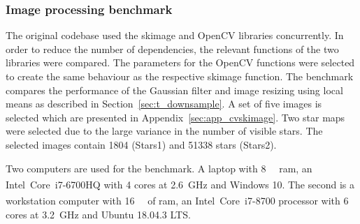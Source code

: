 \begin{table}[htb]
    \centering
    \caption{Summary of two profiles obtained while executing a complete run of \gls{sispo}, i.e. rendering, compression and reconstruction. More than \SI{90}{\percent} of total time is spent rendering images. Values are rounded to one decimal precision.}
    \label{tab:profiles}
\end{table}

\subsubsection{Image processing benchmark} \label{sec:cvskimage}
The original codebase used the \gls{skimage} and OpenCV libraries concurrently. In order to reduce the number of dependencies, the relevant functions of the two libraries were compared. The parameters for the OpenCV functions were selected to create the same behaviour as the respective \gls{skimage} function. The benchmark compares the performance of the Gaussian filter and image resizing using local means as described in Section~\ref{sec:t_downsample}. A set of five images is selected which are presented in Appendix~\ref{sec:app_cvskimage}. Two star maps were selected due to the large variance in the number of visible stars. The selected images contain 1804 (Stars1) and 51338 stars (Stars2).

Two computers are used for the benchmark. A laptop with \SI{8}{\giga\byte} \gls{ram}, an Intel\textsuperscript{\textregistered}~Core\texttrademark~i7-6700HQ with \SI{4}{} cores at \SI{2.6}{\giga\hertz} and Windows 10. The second is a workstation computer with \SI{16}{\giga\byte} of \gls{ram}, an Intel\textsuperscript{\textregistered}~Core\texttrademark~i7-8700 processor with \SI{6}{} cores at \SI{3.2}{\giga\hertz} and Ubuntu 18.04.3 LTS.


